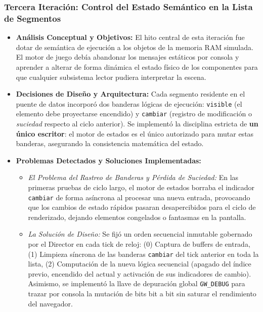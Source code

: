\subsubsection{Tercera Iteración: Control del Estado Semántico en la Lista de Segmentos}
\begin{itemize}
	\item \textbf{Análisis Conceptual y Objetivos:} El hito central de esta iteración fue dotar de semántica de ejecución a los objetos de la memoria RAM simulada. El motor de juego debía abandonar los mensajes estáticos por consola y aprender a alterar de forma dinámica el estado físico de los componentes para que cualquier subsistema lector pudiera interpretar la escena.
	\item \textbf{Decisiones de Diseño y Arquitectura:} Cada segmento residente en el puente de datos incorporó dos banderas lógicas de ejecución: \texttt{visible} (el elemento debe proyectarse encendido) y \texttt{cambiar} (registro de modificación o \textit{suciedad} respecto al ciclo anterior). Se implementó la disciplina estricta de \textbf{un único escritor}: el motor de estados es el único autorizado para mutar estas banderas, asegurando la consistencia matemática del estado.
	\item \textbf{Problemas Detectados y Soluciones Implementadas:}
	\begin{itemize}
		\item \textit{El Problema del Rastreo de Banderas y Pérdida de Suciedad:} En las primeras pruebas de ciclo largo, el motor de estados borraba el indicador \texttt{cambiar} de forma asíncrona al procesar una nueva entrada, provocando que los cambios de estado rápidos pasaran desapercibidos para el ciclo de renderizado, dejando elementos congelados o fantasmas en la pantalla.
		\item \textit{La Solución de Diseño:} Se fijó un orden secuencial inmutable gobernado por el Director en cada tick de reloj: (0) Captura de buffers de entrada, (1) Limpieza síncrona de las banderas \texttt{cambiar} del tick anterior en toda la lista, (2) Computación de la nueva lógica secuencial (apagado del índice previo, encendido del actual y activación de sus indicadores de cambio). Asimismo, se implementó la llave de depuración global \texttt{GW\_DEBUG} para trazar por consola la mutación de bits bit a bit sin saturar el rendimiento del navegador.
	\end{itemize}
\end{itemize}

